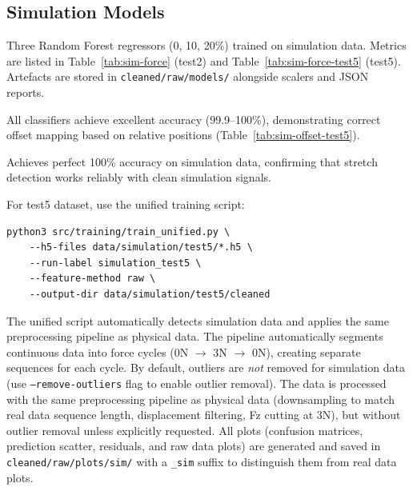 \documentclass[11pt,a4paper]{article}
\begin{document}
\subsection{Simulation Models}
\begin{description}[leftmargin=1.5em]
    \item[Per-stretch force regressors.] Three Random Forest regressors (0, 10, 20\%) trained on simulation data.
          Metrics are listed in Table~\ref{tab:sim-force} (test2) and Table~\ref{tab:sim-force-test5} (test5).
          Artefacts are stored in \texttt{cleaned/raw/models/} alongside scalers and JSON reports.
    \item[Per-stretch press location classifiers.] All classifiers achieve excellent accuracy (99.9--100\%),
          demonstrating correct offset mapping based on relative positions (Table~\ref{tab:sim-offset-test5}).
    \item[Stretch classifier.] Achieves perfect 100\% accuracy on simulation data, confirming that
          stretch detection works reliably with clean simulation signals.
    \item[Training invocation.] For test5 dataset, use the unified training script:
\begin{verbatim}
python3 src/training/train_unified.py \
    --h5-files data/simulation/test5/*.h5 \
    --run-label simulation_test5 \
    --feature-method raw \
    --output-dir data/simulation/test5/cleaned
\end{verbatim}
          The unified script automatically detects simulation data and applies the same preprocessing pipeline as physical data.
          The pipeline automatically segments continuous data into force cycles (0N $\rightarrow$ 3N $\rightarrow$ 0N),
          creating separate sequences for each cycle. By default, outliers are \emph{not} removed for simulation data
          (use \texttt{--remove-outliers} flag to enable outlier removal). The data is processed with the same
          preprocessing pipeline as physical data (downsampling to match real data sequence length, displacement
          filtering, Fz cutting at 3N), but without outlier removal unless explicitly requested. All plots (confusion matrices,
          prediction scatter, residuals, and raw data plots) are generated and saved in \texttt{cleaned/raw/plots/sim/}
          with a \texttt{\_sim} suffix to distinguish them from real data plots.
\end{description}
\end{document}
